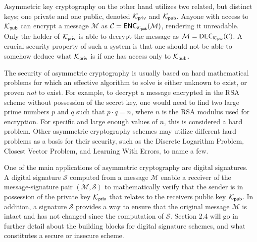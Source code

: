 Asymmetric key cryptography on the other hand utilizes two related, but distinct keys; one private and one public, denoted $\mathcal{K}_{\mathsf{priv}}$ and $\mathcal{K}_{\mathsf{pub}}$.
Anyone with access to $\mathcal{K}_{\mathsf{pub}}$ can encrypt a message $\mathcal{M}$ as $\mathcal{C} = \mathsf{ENC}_{\mathcal{K}_{\mathsf{pub}}}(\mathcal{M})$, rendering it unreadable. Only the holder of $\mathcal{K}_{\mathsf{priv}}$ is able to decrypt the message
as $\mathcal{M} = \mathsf{DEC}_{\mathcal{K}_{\mathsf{priv}}}(\mathcal{C})$. A crucial security property of such a system is that one should not be able to somehow deduce what $\mathcal{K}_{\mathsf{priv}}$ is if one has access only to $\mathcal{K}_{\mathsf{pub}}$.

The security of asymmetric cryptography is usually based on hard mathematical problems for which an effective algorithm to solve is either unknown to exist, or proven \textit{not} to exist. 
For example, to decrypt a message encrypted in the RSA scheme \cite{RSA78} without possession of the secret key, one would need to find two large prime numbers $p$ and $q$ such that 
$p \cdot q = n$, where $n$ is the RSA modulus used for encryption. For specific and large enough values of $n$, this is considered a hard problem. \cite{ENCYCLOPEDIA}
Other asymmetric cryptography schemes may utilize different hard problems as a basis for their security, such as the Discrete Logarithm Problem, Closest Vector Problem, and Learning With Errors, to name a few.


One of the main applications of asymmetric cryptography are digital signatures. A digital signature $\mathcal{S}$ computed from a message $\mathcal{M}$ enable a receiver of the 
message-signature pair $(\mathcal{M}, \mathcal{S})$ to mathematically verify that the sender is in possession of the private key $\mathcal{K}_{\mathsf{priv}}$ that relates to the receivers public key $\mathcal{K}_{\mathsf{pub}}$.
In addition, a signature $\mathcal{S}$ provides a way to ensure that the original message $\mathcal{M}$ is intact and has not changed since the computation of $\mathcal{S}$.
Section 2.4 will go in further detail about the building blocks for digital signature schemes, and what constitutes a secure or insecure scheme.

